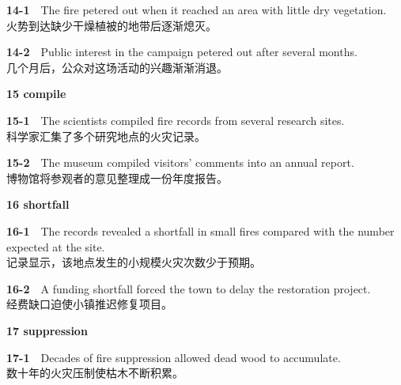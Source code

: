 \documentclass[a4paper,11pt,openany]{report}
\newcommand{\zhline}[1]{{\CJKsf\color{bodygrey}#1}}
\begin{document}
\begin{samepage}
\textbf{14-1}　The fire petered out when it reached an area with little dry vegetation.\\
\zhline{火势到达缺少干燥植被的地带后逐渐熄灭。}
\par\end{samepage}

\begin{samepage}
\textbf{14-2}　Public interest in the campaign petered out after several months.\\
\zhline{几个月后，公众对这场活动的兴趣渐渐消退。}
\par\end{samepage}

\textbf{15 compile}

\begin{samepage}
\textbf{15-1}　The scientists compiled fire records from several research sites.\\
\zhline{科学家汇集了多个研究地点的火灾记录。}
\par\end{samepage}

\begin{samepage}
\textbf{15-2}　The museum compiled visitors' comments into an annual report.\\
\zhline{博物馆将参观者的意见整理成一份年度报告。}
\par\end{samepage}

\textbf{16 shortfall}

\begin{samepage}
\textbf{16-1}　The records revealed a shortfall in small fires compared with the number expected at the site.\\
\zhline{记录显示，该地点发生的小规模火灾次数少于预期。}
\par\end{samepage}

\begin{samepage}
\textbf{16-2}　A funding shortfall forced the town to delay the restoration project.\\
\zhline{经费缺口迫使小镇推迟修复项目。}
\par\end{samepage}

\textbf{17 suppression}

\begin{samepage}
\textbf{17-1}　Decades of fire suppression allowed dead wood to accumulate.\\
\zhline{数十年的火灾压制使枯木不断积累。}
\par\end{samepage}
\end{document}
